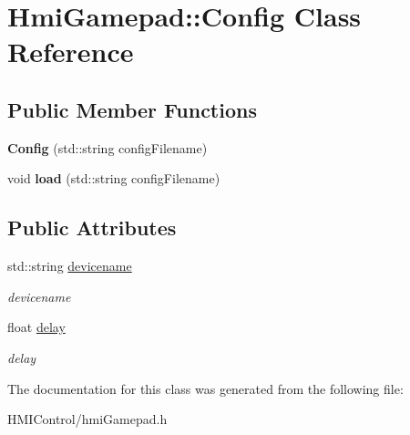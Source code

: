 \hypertarget{classHmiGamepad_1_1Config}{}\section{Hmi\+Gamepad\+:\+:Config Class Reference}
\label{classHmiGamepad_1_1Config}
\subsection*{Public Member Functions}
\begin{DoxyCompactItemize}
\item 
{\bfseries Config} (std\+::string config\+Filename)\hypertarget{classHmiGamepad_1_1Config_a412a0a2eabc1a97786c94c3eb415e82c}{}\label{classHmiGamepad_1_1Config_a412a0a2eabc1a97786c94c3eb415e82c}

\item 
void {\bfseries load} (std\+::string config\+Filename)\hypertarget{classHmiGamepad_1_1Config_a9e9a34a7266583fd99a39c4e27f74c5a}{}\label{classHmiGamepad_1_1Config_a9e9a34a7266583fd99a39c4e27f74c5a}

\end{DoxyCompactItemize}
\subsection*{Public Attributes}
\begin{DoxyCompactItemize}
\item 
std\+::string \hyperlink{classHmiGamepad_1_1Config_aadc222e055ce17ba8f0dc3a8dc77c455}{devicename}\hypertarget{classHmiGamepad_1_1Config_aadc222e055ce17ba8f0dc3a8dc77c455}{}\label{classHmiGamepad_1_1Config_aadc222e055ce17ba8f0dc3a8dc77c455}

\begin{DoxyCompactList}\small\item\em devicename \end{DoxyCompactList}\item 
float \hyperlink{classHmiGamepad_1_1Config_a3c762ca0dd8a74b0ad9d4f1991b7f96b}{delay}\hypertarget{classHmiGamepad_1_1Config_a3c762ca0dd8a74b0ad9d4f1991b7f96b}{}\label{classHmiGamepad_1_1Config_a3c762ca0dd8a74b0ad9d4f1991b7f96b}

\begin{DoxyCompactList}\small\item\em delay \end{DoxyCompactList}\end{DoxyCompactItemize}


The documentation for this class was generated from the following file\+:\begin{DoxyCompactItemize}
\item 
H\+M\+I\+Control/hmi\+Gamepad.\+h\end{DoxyCompactItemize}
